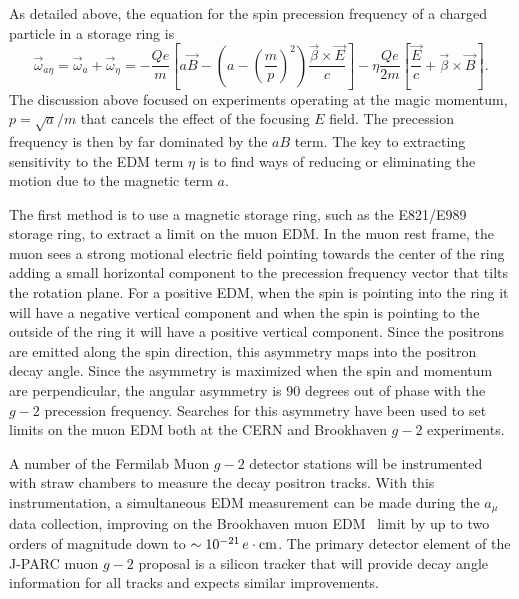 




As detailed above, the equation for the spin precession frequency of a charged particle in a storage ring is
\begin{equation}
\vec{\omega}_{a\eta}= \vec \omega_a + \vec \omega_\eta = -
 \frac {Qe}  {m}
\left[
a \vec{B}
- \left( a - \left(  \frac {m} {p} \right)^2  \right)
 \frac {\vec{\beta} \times \vec{E}} {c} \right] -  \eta \frac {Qe}{2m}
 \left[ \frac {\vec{E}} {c}  +  \vec{\beta} \times \vec{B} \right] .
 \label{eq:omegaa-edm2}
\end{equation}
The discussion above focused on experiments operating at the magic momentum, $p = \sqrt{a }/m$ that cancels the effect of the focusing $E$ field.  The precession frequency is then by far dominated by the $aB$ term.  
The key to extracting sensitivity to the EDM term $\eta$ is to find ways of reducing or eliminating the motion due to the magnetic term $a$.  

The first method is to use a magnetic storage ring, such as the E821/E989 storage ring, to extract a 
limit on the muon EDM.  In the muon rest frame, the muon sees a strong motional electric field
 pointing towards the center of the ring adding a small horizontal component to the precession 
 frequency vector that tilts the rotation plane.  For a positive EDM, when the spin is pointing into the 
 ring it will have a negative vertical component and when the spin is pointing to the outside of the ring 
 it will have a positive vertical component.  Since the positrons are emitted along the spin direction, 
 this asymmetry maps into the positron decay angle. Since the asymmetry is maximized when the spin 
 and momentum are perpendicular, the angular asymmetry is 90 degrees out of phase with the $g-2$ precession frequency.  
Searches for this asymmetry have been used to set limits on the muon EDM both at the CERN and Brookhaven $g-2$ experiments. 

 A number of the Fermilab Muon $g-2$ detector stations will
be instrumented with straw chambers to measure the decay positron
tracks. With this instrumentation, a simultaneous EDM
measurement can be made during the $a_\mu$ data collection,
improving on the  Brookhaven muon EDM~\cite{Bennett08-edm}
 limit by up to two orders of magnitude down to
$\sim 10^{-21}\,  e \cdot {\rm cm}$.   The primary detector element of the J-PARC muon $g-2$ proposal  is a silicon tracker that will provide
 decay angle information for all tracks and expects similar improvements.

